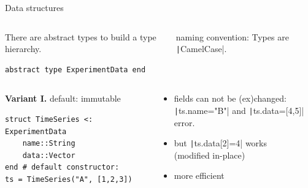 \documentclass[aspectratio=169, 12pt]{beamer}
\begin{document}
    \begin{frame}[fragile]{Data structures}
        \vspace{-.25\baselineskip}
        \begin{columns}[T]
            \begin{column}{.68\textwidth}
                There are \alert{abstract types} to build a type hierarchy.
                \begin{verbatim}
abstract type ExperimentData end
                \end{verbatim}
            \end{column}
            \pause
            \begin{column}{.3\textwidth}
            \alert{naming convention:} Types are
            \texttt|CamelCase|.
            \end{column}
        \end{columns}
        \vspace{\baselineskip}
        \pause
        \begin{columns}[T]
            \begin{column}{.51\textwidth}
                \textbf{Variant I.} default: immutable
                \begin{verbatim}
struct TimeSeries <: ExperimentData
    name::String
    data::Vector
end # default constructor:
ts = TimeSeries("A", [1,2,3])
                \end{verbatim}
            \end{column}
            \begin{column}{.48\textwidth}
                \vspace{-.25\baselineskip}
                \pause
                \begin{itemize}[<+->]
                    \item fields can not be (ex)changed:\\
                    \texttt|ts.name="B"| and
                    \texttt|ts.data=[4,5]| error.\\[.25\baselineskip]
                    \item\alert{but} \texttt|ts.data[2]=4| works
                    \\(modified in-place)
                    \item more efficient

\end{itemize}
\end{column}
\end{columns}
\end{frame}
\end{document}
